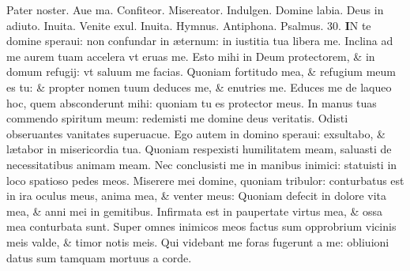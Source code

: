 \documentclass[a5paper,10pt]{book}
\def\ae{æ}
\begin{document}
\begin{multicols*}{2}
\vspace{-1em}
\par \noindent \color{red} P\color{black}ater noster. Aue ma. Confiteor. Misereator. Indulgen. Domine labia. Deus in adiuto. \color{red} Inuita. \color{black} Venite exul. \color{red} Inuita. Hymnus. Antiphona. \quad Psalmus. 30. \color{black}
\lettrine[lines=2]{\bfseries \color{red} I}{}N te domine speraui: non confundar in \ae ternum: in iustitia tua libera me.
\newline \color{red} I\color{black}nclina ad me aurem tuam accelera vt eruas me.
\newline \color{red} E\color{black}sto mihi in Deum protectorem, \& in domum refugij: vt saluum me facias.
\newline \color{red} Q\color{black}uoniam fortitudo mea, \& refugium meum es tu: \& propter nomen tuum deduces me, \& enutries me.
\newline \color{red} E\color{black}duces me de laqueo hoc, quem absconderunt mihi: quoniam tu es protector meus.
\newline \color{red} I\color{black}n manus tuas commendo spiritum meum: redemisti me domine deus veritatis.
\newline \color{red} O\color{black}disti obseruantes vanitates superuacue.
\newline \color{red} E\color{black}go autem in domino speraui: exsultabo, \& l\ae tabor in misericordia tua.
\newline \color{red} Q\color{black}uoniam respexisti humilitatem meam, saluasti de necessitatibus animam meam.
\newline \color{red} N\color{black}ec conclusisti me in manibus inimici: statuisti in loco spatioso pedes meos.
\newline \color{red} M\color{black}iserere mei domine, quoniam tribulor: conturbatus est in ira oculus meus, anima mea, \& venter meus:
\newline \color{red} Q\color{black}uoniam defecit in dolore vita mea, \& anni mei in gemitibus.
\newline \color{red} I\color{black}nfirmata est in paupertate virtus mea, \& ossa mea conturbata sunt.
\newline \color{red} S\color{black}uper omnes inimicos meos factus sum opprobrium vicinis meis valde, \& timor notis meis.
\newline \color{red} Q\color{black}ui videbant me foras fugerunt a me: obliuioni datus sum tamquam mortuus a corde.

\end{multicols*}
\end{document}
